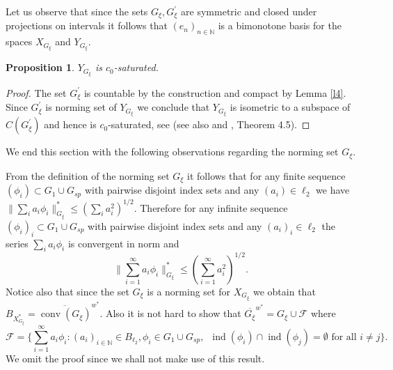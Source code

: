 \documentclass[a4paper]{amsart}
\theoremstyle{plain}
\newtheorem{proposition}[theorem]{Proposition}
\newcommand{\N}{\mathbb{N}}
\newcommand{\norm}[1][\cdot]{\lVert #1\rVert}
\DeclareMathOperator{\conv}{conv}
\DeclareMathOperator{\ind}{ind}
\begin{document}
Let us observe that since the sets $G_{\xi}, G_{\xi}^{\prime}$ are symmetric and closed
under projections on intervals it follows that $(e_{n})_{n\in\N}$ is a bimonotone basis
for the spaces  $X_{G_{\xi}}$ and $Y_{G_{\xi}}$.
\begin{proposition}\label{c0}
$Y_{G_{\xi}}$ is $c_0$-saturated.
\end{proposition}
\begin{proof}
The set $G_{\xi}^\prime$ is countable by the construction and compact by Lemma \ref{l4}.
Since  $G_{\xi}^{\prime}$ is norming set of  $Y_{G_{\xi}}$ we conclude that $Y_{G_{\xi}}$
is isometric to a subspace of $C(G_{\xi}^{\prime})$ and hence is $c_0$-saturated, see
\cite{PS} (see also \cite{AK} and \cite{Kal}, Theorem 4.5).
\end{proof}
We end this section with the following observations regarding the norming set $G_{\xi}$.

From the definition of the norming set  $G_{\xi}$ it follows that for any finite sequence
$(\phi_i)\subset G_1\cup G_{sp}$ with pairwise disjoint index sets and any
$(a_i)\in\ell_2$ we have $\norm[\sum_ia_i\phi_i]_{G_\xi}^*\leq (\sum_ia_i^2)^{1/2}$.
Therefore for any infinite sequence $(\phi_i)_{i}\subset G_{1}\cup G_{sp}$ with pairwise
disjoint index sets and any $(a_i)_i\in\ell_2$ the series $\sum_ia_i\phi_i$ is convergent
in norm and
$$
\|\sum_{i=1}^{\infty}a_{i}\phi_{i}\|_{G_\xi}^*\leq
(\sum_{i=1}^{\infty}a_{i}^{2})^{1/2}.
$$
Notice also that since the set $G_{\xi}$ is a norming set for $X_{G_\xi}$ we obtain that
$B_{X_{G_{\xi}}^{*}}=\overline{\conv(G_{\xi})}^{w^{*}}$.
Also it is not hard  to show that
 $\overline{G_{\xi}}^{w^*}=G_{\xi}\cup  \mathcal{F}$ where
$$
\mathcal{F}=\{\sum\limits_{i=1}^{\infty}a_{i}\phi_{i}: (a_{i})_{i\in\N}\in B_{\ell_2},
\phi_{i}\in G_{1}\cup G_{sp},\,\,\,\ind(\phi_{i})\cap \ind(\phi_{j})=\emptyset\,\,
\mbox{for all $i\ne j$}\}.
$$
We omit the proof since we shall not make use of this result.
\end{document}
